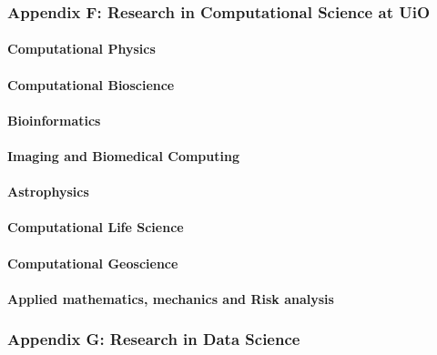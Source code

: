 \documentclass[]{article}
\let\oldparagraph\paragraph
\renewcommand{\paragraph}[1]{\oldparagraph{#1}\mbox{}}
\begin{document}
\hypertarget{appendix-f-research-in-computational-science-at-uio}{%
\subsubsection{Appendix F: Research in Computational Science at
UiO}\label{appendix-f-research-in-computational-science-at-uio}}

\hypertarget{computational-physics}{%
\paragraph{Computational Physics}\label{computational-physics}}

\hypertarget{computational-bioscience}{%
\paragraph{Computational Bioscience}\label{computational-bioscience}}

\hypertarget{bioinformatics}{%
\paragraph{Bioinformatics}\label{bioinformatics}}

\hypertarget{imaging-and-biomedical-computing}{%
\paragraph{Imaging and Biomedical
Computing}\label{imaging-and-biomedical-computing}}

\hypertarget{astrophysics}{%
\paragraph{Astrophysics}\label{astrophysics}}

\hypertarget{computational-life-science-1}{%
\paragraph{Computational Life
Science}\label{computational-life-science-1}}

\hypertarget{computational-geoscience-1}{%
\paragraph{Computational Geoscience}\label{computational-geoscience-1}}

\hypertarget{applied-mathematics-mechanics-and-risk-analysis}{%
\paragraph{Applied mathematics, mechanics and Risk
analysis}\label{applied-mathematics-mechanics-and-risk-analysis}}

\hypertarget{appendix-g-research-in-data-science}{%
\subsubsection{Appendix G: Research in Data
Science}\label{appendix-g-research-in-data-science}}
\end{document}
